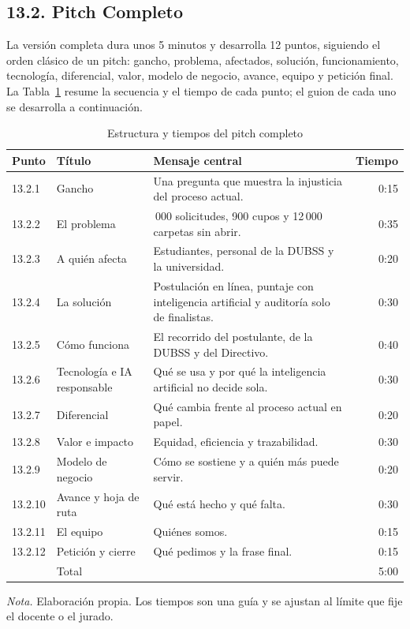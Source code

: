 \subsection{13.2. Pitch Completo}

La versión completa dura unos 5 minutos y desarrolla 12 puntos, siguiendo el orden clásico de un pitch: gancho, problema, afectados, solución, funcionamiento, tecnología, diferencial, valor, modelo de negocio, avance, equipo y petición final. La Tabla~\ref{tab:pitch_tiempos} resume la secuencia y el tiempo de cada punto; el guion de cada uno se desarrolla a continuación.

\begin{table}[H]
\centering
\caption{Estructura y tiempos del pitch completo}\label{tab:pitch_tiempos}
\begin{threeparttable}
\begin{tabular}{@{}l >{\raggedright\arraybackslash}p{3.0cm} >{\raggedright\arraybackslash}p{7.2cm} r@{}}
\toprule
Punto & Título & Mensaje central & Tiempo \\
\midrule
13.2.1 & Gancho & Una pregunta que muestra la injusticia del proceso actual. & 0:15 \\
13.2.2 & El problema & 20\,000 solicitudes, 900 cupos y 12\,000 carpetas sin abrir. & 0:35 \\
13.2.3 & A quién afecta & Estudiantes, personal de la DUBSS y la universidad. & 0:20 \\
13.2.4 & La solución & Postulación en línea, puntaje con inteligencia artificial y auditoría solo de finalistas. & 0:30 \\
13.2.5 & Cómo funciona & El recorrido del postulante, de la DUBSS y del Directivo. & 0:40 \\
13.2.6 & Tecnología e IA responsable & Qué se usa y por qué la inteligencia artificial no decide sola. & 0:30 \\
13.2.7 & Diferencial & Qué cambia frente al proceso actual en papel. & 0:20 \\
13.2.8 & Valor e impacto & Equidad, eficiencia y trazabilidad. & 0:30 \\
13.2.9 & Modelo de negocio & Cómo se sostiene y a quién más puede servir. & 0:20 \\
13.2.10 & Avance y hoja de ruta & Qué está hecho y qué falta. & 0:30 \\
13.2.11 & El equipo & Quiénes somos. & 0:15 \\
13.2.12 & Petición y cierre & Qué pedimos y la frase final. & 0:15 \\
\midrule
 & Total & & 5:00 \\
\bottomrule
\end{tabular}
\begin{tablenotes}
\item \textit{Nota.} Elaboración propia. Los tiempos son una guía y se ajustan al límite que fije el docente o el jurado.
\end{tablenotes}
\end{threeparttable}
\end{table}


